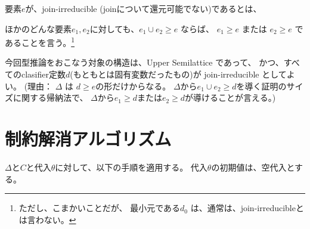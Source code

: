 \documentclass[dvipdfmx]{jsarticle}
\begin{document}
要素$e$が、join-irreducible (joinについて還元可能でない)であるとは、

ほかのどんな要素$e_1,e_2$に対しても、$e_1 \cup e_2 \ge e$ ならば、
$e_1 \ge e$ または
$e_2 \ge e$ であることを言う。\footnote{ただし、こまかいことだが、
最小元である$d_0$ は、通常は、join-irreducibleとは言わない。}

今回型推論をおこなう対象の構造は、Upper Semilattice であって、
かつ、すべてのclasifier定数$d$(もともとは固有変数だったもの)が
join-irreducible としてよい。
(理由： $\Delta$ は $d\ge e$の形だけからなる。
$\Delta$から$e_1 \cup e_2 \ge d$を導く証明のサイズに関する帰納法で、
$\Delta$から$e_1 \ge d$または$e_2 \ge d$が導けることが言える。)

\section{制約解消アルゴリズム}

$\Delta$と$C$と代入$\theta$に対して、以下の手順を適用する。
代入$\theta$の初期値は、空代入とする。
\end{document}
